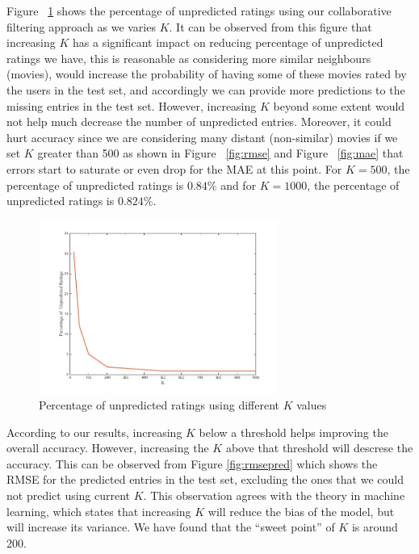 Figure ~\ref{fig:perc} shows the percentage of unpredicted ratings
using our collaborative filtering approach as we varies $K$. It can be
observed from this figure that increasing $K$ has a significant impact
on reducing percentage of unpredicted ratings we have, this is
reasonable as considering more similar neighbours (movies), would
increase the probability of having some of these movies rated by the
users in the test set, and accordingly we can provide more predictions
to the missing entries in the test set. However, increasing $K$ beyond
some extent would not help much decrease the number of unpredicted
entries. Moreover, it could hurt accuracy since we are considering
many distant (non-similar) movies if we set $K$ greater than 500 as
shown in Figure ~\ref{fig:rmse} and Figure ~\ref{fig:mae} that errors
start to saturate or even drop for the MAE at this point. For $K=500$,
the percentage of unpredicted ratings is $0.84\%$ and for $K=1000$,
the percentage of unpredicted ratings is $0.824\%$.

\begin{figure}[!ht]
  \centering \includegraphics[width=0.7\textwidth]{images/perc.png}
  \caption{Percentage of unpredicted ratings using different $K$
    values}
  \label{fig:perc}
\end{figure}

According to our results, increasing $K$ below a threshold helps
improving the overall accuracy. However, increasing the $K$ above that
threshold will descrese the accuracy. This can be observed from Figure
\ref{fig:rmsepred} which shows the RMSE for the predicted entries in
the test set, excluding the ones that we could not predict using
current $K$. This observation agrees with the theory in machine
learning, which states that increasing $K$ will reduce the bias of the
model, but will increase its variance. We have found that the ``sweet
point'' of $K$ is around 200.


